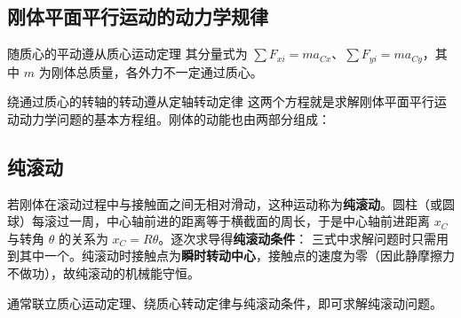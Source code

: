     \subsection{刚体平面平行运动的动力学规律}
    随质心的平动遵从质心运动定理
    其分量式为 $\sum F_{xi}=ma_{Cx}$、$\sum F_{yi}=ma_{Cy}$，其中 $m$ 为刚体总质量，各外力不一定通过质心。

    绕通过质心的转轴的转动遵从定轴转动定律
    这两个方程就是求解刚体平面平行运动动力学问题的基本方程组。刚体的动能也由两部分组成：

    \subsection{纯滚动}
    若刚体在滚动过程中与接触面之间无相对滑动，这种运动称为\textbf{纯滚动}。圆柱（或圆球）每滚过一周，中心轴前进的距离等于横截面的周长，于是中心轴前进距离 $x_{C}$ 与转角 $\theta$ 的关系为 $x_{C}=R\theta$。逐次求导得\textbf{纯滚动条件}：
    三式中求解问题时只需用到其中一个。纯滚动时接触点为\textbf{瞬时转动中心}，接触点的速度为零（因此静摩擦力不做功），故纯滚动的机械能守恒。

    通常联立质心运动定理、绕质心转动定律与纯滚动条件，即可求解纯滚动问题。
